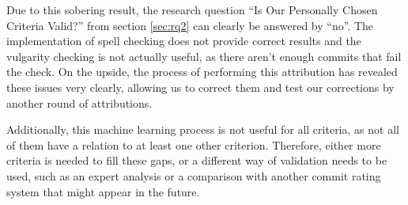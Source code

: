 Due to this sobering result, the research question ``Is Our Personally Chosen Criteria Valid?'' from section \ref{sec:rq2} can clearly be answered by ``no''. The implementation of spell checking does not provide correct results and the vulgarity checking is not actually useful, as there aren't enough commits that fail the check. On the upside, the process of performing this attribution has revealed these issues very clearly, allowing us to correct them and test our corrections by another round of attributions.

Additionally, this machine learning process is not useful for all criteria, as not all of them have a relation to at least one other criterion. Therefore, either more criteria is needed to fill these gaps, or a different way of validation needs to be used, such as an expert analysis or a comparison with another commit rating system that might appear in the future.


%
%
